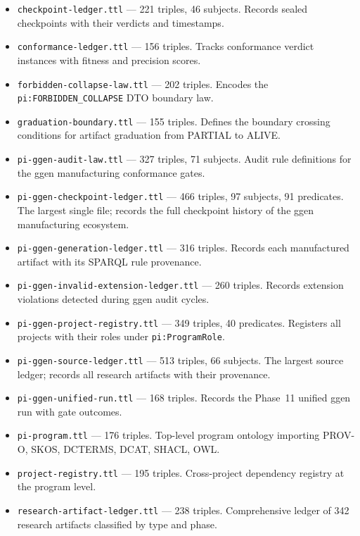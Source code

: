 \begin{itemize}
  \item \texttt{checkpoint-ledger.ttl} --- 221 triples, 46 subjects. Records sealed
        checkpoints with their verdicts and timestamps.
  \item \texttt{conformance-ledger.ttl} --- 156 triples. Tracks conformance verdict
        instances with fitness and precision scores.
  \item \texttt{forbidden-collapse-law.ttl} --- 202 triples. Encodes the
        \texttt{pi:FORBIDDEN\_COLLAPSE} DTO boundary law.
  \item \texttt{graduation-boundary.ttl} --- 155 triples. Defines the boundary crossing
        conditions for artifact graduation from PARTIAL to ALIVE.
  \item \texttt{pi-ggen-audit-law.ttl} --- 327 triples, 71 subjects. Audit rule
        definitions for the ggen manufacturing conformance gates.
  \item \texttt{pi-ggen-checkpoint-ledger.ttl} --- 466 triples, 97 subjects, 91
        predicates. The largest single file; records the full checkpoint history of the
        ggen manufacturing ecosystem.
  \item \texttt{pi-ggen-generation-ledger.ttl} --- 316 triples. Records each
        manufactured artifact with its SPARQL rule provenance.
  \item \texttt{pi-ggen-invalid-extension-ledger.ttl} --- 260 triples. Records
        extension violations detected during ggen audit cycles.
  \item \texttt{pi-ggen-project-registry.ttl} --- 349 triples, 40 predicates.
        Registers all projects with their roles under \texttt{pi:ProgramRole}.
  \item \texttt{pi-ggen-source-ledger.ttl} --- 513 triples, 66 subjects. The
        largest source ledger; records all research artifacts with their provenance.
  \item \texttt{pi-ggen-unified-run.ttl} --- 168 triples. Records the Phase~11
        unified ggen run with gate outcomes.
  \item \texttt{pi-program.ttl} --- 176 triples. Top-level program ontology
        importing PROV-O, SKOS, DCTERMS, DCAT, SHACL, OWL.
  \item \texttt{project-registry.ttl} --- 195 triples. Cross-project dependency
        registry at the program level.
  \item \texttt{research-artifact-ledger.ttl} --- 238 triples. Comprehensive ledger
        of 342 research artifacts classified by type and phase.
\end{itemize}

